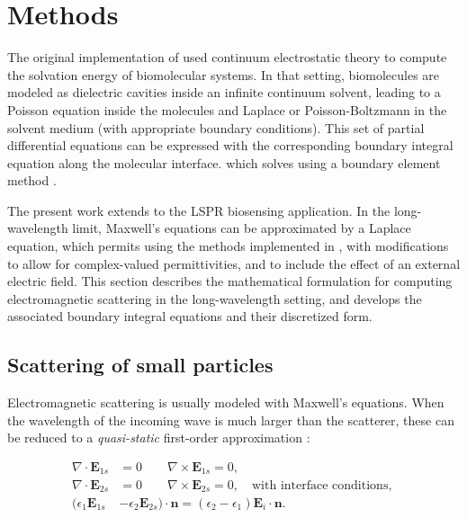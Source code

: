 
\chapter{Methods} \label{chap:methods}
\graphicspath{{methods/figs/}}

The original implementation of \pygbe used continuum electrostatic theory to compute
the solvation energy of biomolecular systems. In that setting, biomolecules are modeled as 
dielectric cavities inside an infinite continuum solvent, 
leading to a Poisson equation inside the molecules and Laplace or Poisson-Boltzmann in the solvent medium (with appropriate boundary conditions).
This set of partial differential equations can be 
expressed with the corresponding boundary integral equation along the molecular interface.
which \pygbe solves using a boundary element method \cite{CooperBardhanBarba2013,CooperClementiBarba2015}.

The present work extends \pygbe to the LSPR biosensing application. 
In the long-wavelength limit, Maxwell's equations can be approximated by a Laplace equation,
which permits using the methods implemented in \pygbe, with modifications
to allow for complex-valued permittivities, and to include the
effect of an external electric field.
This section describes the mathematical formulation for computing electromagnetic scattering 
in the long-wavelength setting, and develops the associated boundary integral equations 
and their discretized form.

\section{Scattering of small particles} \label{sec:scattering_small}

Electromagnetic scattering is usually modeled with Maxwell's equations. When the wavelength of the incoming wave is much larger than the
scatterer, these can be reduced to a \emph{quasi-static} 
first-order approximation \cite{MayergoyzZhang2007}:

\begin{align} \label{eq:electrostatic_scatter_E}
\nabla \cdot \mathbf{E}_{1s} &= 0 \qquad \nabla \times \mathbf{E}_{1s} = 0, \nonumber \\
\nabla \cdot \mathbf{E}_{2s} &= 0 \qquad \nabla \times \mathbf{E}_{2s} = 0, \nonumber \quad
\text{with interface conditions, } \nonumber \\
(\epsilon_1\mathbf{E}_{1s} &- \epsilon_2\mathbf{E}_{2s})\cdot\mathbf{n} = (\epsilon_2-\epsilon_1)\mathbf{E}_i\cdot \mathbf{n}.
\end{align}

